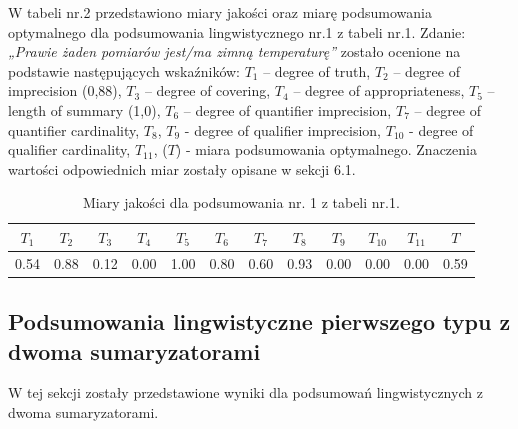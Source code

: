 \documentclass{article}
\begin{document}
W tabeli nr.2 przedstawiono miary jakości oraz miarę podsumowania optymalnego dla podsumowania lingwistycznego nr.1 z tabeli nr.1. Zdanie: \textit{„Prawie żaden pomiarów jest/ma zimną temperaturę”} zostało ocenione na podstawie następujących wskaźników: \(T_1\) – degree of truth, \(T_2\) – degree of imprecision (0{,}88), \(T_3\) – degree of covering, \(T_4\) – degree of appropriateness, \(T_5\) – length of summary (1{,}0), \(T_6\) – degree of quantifier imprecision, \(T_7\) – degree of quantifier cardinality, \(T_8\), \(T_9\) - degree of qualifier imprecision, \(T_{10}\) - degree of qualifier cardinality, \(T_{11}\), (\(T\)) - miara podsumowania optymalnego. Znaczenia wartości odpowiednich miar zostały opisane w sekcji 6.1.

  \begin{table}[H]
    \centering
    \begin{tabular}{|c|c|c|c|c|c|c|c|c|c|c|c|}
    \hline
    \textbf{\(T_1\)} &\textbf{\(T_2\)} & \textbf{\(T_3\)} & \textbf{\(T_4\)} & \textbf{\(T_5\)} & \textbf{\(T_6\)} & \textbf{\(T_7\)} & \textbf{\(T_8\)} & \textbf{\(T_9\)} & \textbf{\(T_{10}\)} & \textbf{\(T_{11}\)} & \textbf{\(T\)} \\ \hline
    0.54 & 0.88 & 0.12 & 0.00 & 1.00 & 0.80 & 0.60 & 0.93 & 0.00 & 0.00 & 0.00 & 0.59 \\ \hline
    \end{tabular}
    \caption{Miary jakości dla podsumowania nr. 1 z tabeli nr.1.}
\end{table}  

\subsection{Podsumowania lingwistyczne pierwszego typu z dwoma sumaryzatorami}
W tej sekcji zostały przedstawione wyniki dla podsumowań lingwistycznych z dwoma sumaryzatorami.
\end{document}
